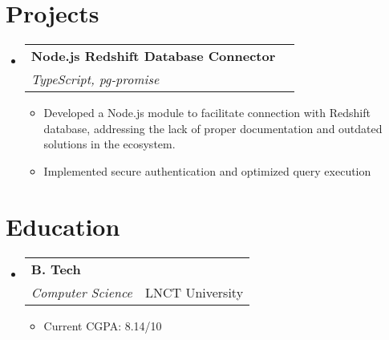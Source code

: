 \documentclass[a4paper,11pt]{article}
\makeatletter
\newcommand{\resumeSubheading}[4]{
\vspace{0.5mm}\item
    \begin{tabular*}{0.98\textwidth}[t]{l@{\extracolsep{\fill}}r}
        \textbf{#1} & \textit{\footnotesize{#4}} \\
        \textit{\footnotesize{#3}} &  \footnotesize{#2}\\
    \end{tabular*}
    \vspace{-2.4mm}
}
\newcommand{\resumeProject}[4]{
\vspace{0.5mm}\item
    \begin{tabular*}{0.98\textwidth}[t]{l@{\extracolsep{\fill}}r}
        \textbf{#1} & \textit{\footnotesize{#3}} \\
        \footnotesize{\textit{#2}} & \footnotesize{#4}
    \end{tabular*}
    \vspace{-2.4mm}
}
\newcommand{\resumeSubHeadingListStart}{\begin{itemize}[leftmargin=*,labelsep=1mm]}
\newcommand{\resumeItemListStart}{\begin{itemize}[leftmargin=*,labelsep=1mm,itemsep=0.5mm]}
\newcommand{\resumeSubHeadingListEnd}{\end{itemize}\vspace{2mm}}
\newcommand{\resumeItemListEnd}{\end{itemize}\vspace{-1mm}}
\makeatother
\begin{document}
\vspace{-4mm}

\section{\textbf{Projects}}
\vspace{-0.4mm}
\resumeSubHeadingListStart

\resumeProject
  {Node.js Redshift Database Connector}
  {TypeScript, pg-promise}
  {}
  {}
\resumeItemListStart
  \item Developed a Node.js module to facilitate connection with Redshift database, addressing the lack of proper documentation and outdated solutions in the ecosystem.
  \item Implemented secure authentication and optimized query execution
\resumeItemListEnd

\resumeSubHeadingListEnd


\vspace{-4mm}

\section{\textbf{Education}}
\vspace{-0.4mm}
\resumeSubHeadingListStart

\resumeSubheading
{B. Tech}{LNCT University}
{Computer Science}{}
\resumeItemListStart
\item Current CGPA: 8.14/10
\resumeItemListEnd

\resumeSubHeadingListEnd
\vspace{-6mm}


\end{document}
